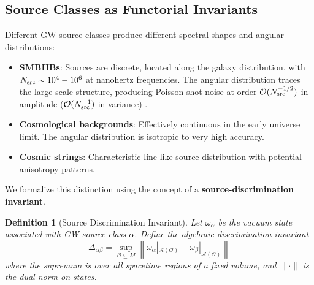 \documentclass[11pt,a4paper]{article}
\newtheorem{definition}{Definition}[section]
\begin{document}
\subsection{Source Classes as Functorial Invariants}\label{sec:source-classes}

Different GW source classes produce different spectral shapes and angular distributions:

\begin{itemize}
\item \textbf{SMBHBs}: Sources are discrete, located along the galaxy distribution, with $N_{\rm src} \sim 10^4-10^6$ at nanohertz frequencies. The angular distribution traces the large-scale structure, producing Poisson shot noise at order $\mathcal{O}(N_{\rm src}^{-1/2})$ in amplitude ($\mathcal{O}(N_{\rm src}^{-1})$ in variance) \cite{Lin:2026}.
\item \textbf{Cosmological backgrounds}: Effectively continuous in the early universe limit. The angular distribution is isotropic to very high accuracy.
\item \textbf{Cosmic strings}: Characteristic line-like source distribution with potential anisotropy patterns.
\end{itemize}

We formalize this distinction using the concept of a \textbf{source-discrimination invariant}.

\begin{definition}[Source Discrimination Invariant]
Let $\omega_\alpha$ be the vacuum state associated with GW source class $\alpha$. Define the algebraic discrimination invariant
\begin{equation}
\Delta_{\alpha\beta} = \sup_{\mathcal{O} \subseteq M} \left\| \omega_\alpha|_{\mathcal{A}(\mathcal{O})} - \omega_\beta|_{\mathcal{A}(\mathcal{O})} \right\|
\end{equation}
where the supremum is over all spacetime regions of a fixed volume, and $\|\cdot\|$ is the dual norm on states.
\end{definition}
\end{document}
